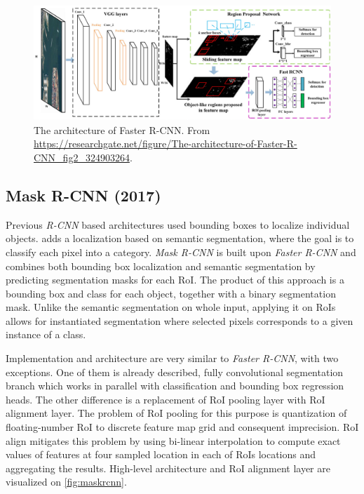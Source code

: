  \begin{figure}
     \centering
     \includegraphics[width=\textwidth]{img/fasterrcnn}
     \caption{The architecture of Faster R-CNN. From \url{https://researchgate.net/figure/The-architecture-of-Faster-R-CNN\_fig2\_324903264}.}
     \label{fig:fasterrcnn}
 \end{figure}

 \subsection{Mask R-CNN (2017)}
Previous \textit{R-CNN} based architectures used bounding boxes to localize individual objects. \citeauthor{bib:maskrcnn} \cite{bib:maskrcnn} adds a localization based on semantic segmentation, where the goal is to classify each pixel into a category. \textit{Mask R-CNN} is built upon \textit{Faster R-CNN} and combines both bounding box localization and semantic segmentation by predicting segmentation masks for each RoI. The product of this approach is a bounding box and class for each object, together with a binary segmentation mask. Unlike the semantic segmentation on whole input, applying it on RoIs allows for instantiated segmentation where selected pixels corresponds to a given instance of a class.

Implementation and architecture are very similar to \textit{Faster R-CNN}, with two exceptions. One of them is already described, fully convolutional segmentation branch which works in parallel with classification and bounding box regression heads. The other difference is a replacement of RoI pooling layer with RoI alignment layer. The problem of RoI pooling for this purpose is quantization of floating-number RoI to discrete feature map grid and consequent imprecision. RoI align mitigates this problem by using bi-linear interpolation to compute exact values of features at four sampled location in each of RoIs locations and aggregating the results. High-level architecture and RoI alignment layer are visualized on \cref{fig:maskrcnn}.

